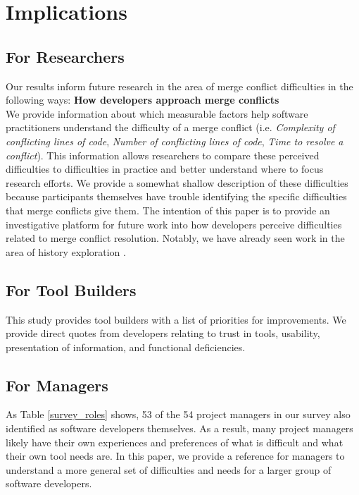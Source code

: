 \section{Implications}\label{implications}
\subsection{For Researchers}
Our results inform future research in the area of merge conflict difficulties in the following ways:
\textbf{How developers approach merge conflicts}\\
We provide information about which measurable factors help software practitioners understand the difficulty of a merge conflict (i.e. \textit{Complexity of conflicting lines of code}, \textit{Number of conflicting lines of code}, \textit{Time to resolve a conflict}). This information allows researchers to compare these perceived difficulties to difficulties in practice and better understand where to focus research efforts. We provide a somewhat shallow description of these difficulties because participants themselves have trouble identifying the specific difficulties that merge conflicts give them. The intention of this paper is to provide an investigative platform for future work into how developers perceive difficulties related to merge conflict resolution. Notably, we have already seen work in the area of history exploration \cite{mihai_lenses}.
\subsection{For Tool Builders}
This study provides tool builders with a list of priorities for improvements. We provide direct quotes from developers relating to trust in tools, usability, presentation of information, and functional deficiencies. 
\subsection{For Managers}
As Table \ref{survey_roles} shows, 53 of the 54 project managers in our survey also identified as software developers themselves. As a result, many project managers likely have their own experiences and preferences of what is difficult and what their own tool needs are. In this paper, we provide a reference for managers to understand a more general set of difficulties and needs for a larger group of software developers.